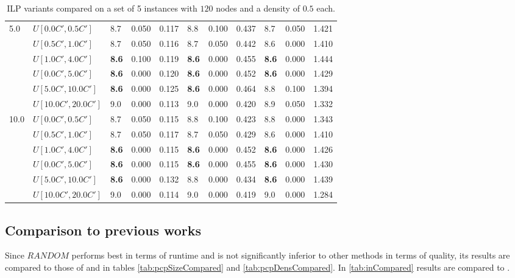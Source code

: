 \begin{table}[h]
{\begin{tabular}{|l|l||l|l|l||l|l|l||l|l|l|}
      \hline\hline
      \multirow{6}{*}{5.0} & $U[0.0C',0.5C']$ & 8.7 & 0.050 & 0.117 & 8.8 & 0.100 & 0.437 & 8.7 & 0.050 & 1.421 \\
       & $U[0.5C',1.0C']$ & 8.7 & 0.050 & 0.116 & 8.7 & 0.050 & 0.442 & 8.6 & 0.000 & 1.410 \\
       & $U[1.0C',4.0C']$ & \textbf{8.6} & 0.100 & 0.119 & \textbf{8.6} & 0.000 & 0.455 & \textbf{8.6} & 0.000 & 1.444 \\
       & $U[0.0C',5.0C']$ & \textbf{8.6} & 0.000 & 0.120 & \textbf{8.6} & 0.000 & 0.452 & \textbf{8.6} & 0.000 & 1.429 \\
       & $U[5.0C',10.0C']$ & \textbf{8.6} & 0.000 & 0.125 & \textbf{8.6} & 0.000 & 0.464 & 8.8 & 0.100 & 1.394 \\
       & $U[10.0C',20.0C']$ & 9.0 & 0.000 & 0.113 & 9.0 & 0.000 & 0.420 & 8.9 & 0.050 & 1.332 \\
      \hline\hline
      \multirow{6}{*}{10.0} & $U[0.0C',0.5C']$ & 8.7 & 0.050 & 0.115 & 8.8 & 0.100 & 0.423 & 8.8 & 0.000 & 1.343 \\
       & $U[0.5C',1.0C']$ & 8.7 & 0.050 & 0.117 & 8.7 & 0.050 & 0.429 & 8.6 & 0.000 & 1.410 \\
       & $U[1.0C',4.0C']$ & \textbf{8.6} & 0.000 & 0.115 & \textbf{8.6} & 0.000 & 0.452 & \textbf{8.6} & 0.000 & 1.426 \\
       & $U[0.0C',5.0C']$ & \textbf{8.6} & 0.000 & 0.115 & \textbf{8.6} & 0.000 & 0.455 & \textbf{8.6} & 0.000 & 1.430 \\
       & $U[5.0C',10.0C']$ & \textbf{8.6} & 0.000 & 0.132 & 8.8 & 0.000 & 0.434 & \textbf{8.6} & 0.000 & 1.439 \\
       & $U[10.0C',20.0C']$ & 9.0 & 0.000 & 0.114 & 9.0 & 0.000 & 0.419 & 9.0 & 0.000 & 1.284 \\
      \hline
      \end{tabular}
      }
      \caption{ILP variants compared on a set of 5 instances with $120$ nodes and a density of $0.5$ each.}
      \label{tab:pcpn120RecoloredTT}\end{table}

\clearpage

\subsection{Comparison to previous works}
Since $RANDOM$ performs best in terms of runtime and is not significantly inferior to other methods in terms of quality, its results are compared to those of \cite{frota-07} and \cite{pop-13} in tables \ref{tab:pcpSizeCompared} and \ref{tab:pcpDensCompared}. In \ref{tab:inCompared} results are compared to \cite{noronha-06}.

